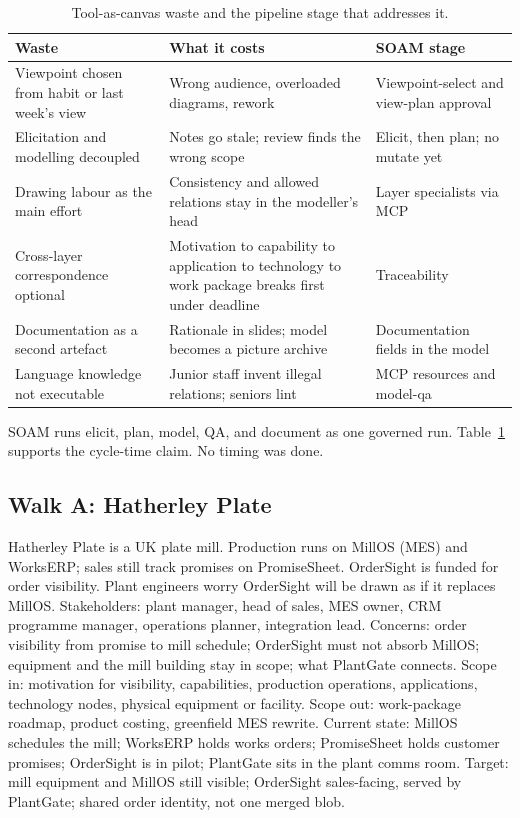 \documentclass[10pt,journal,compsoc]{IEEEtran}
\begin{document}
\begin{table}[!t]
\caption{Tool-as-canvas waste and the pipeline stage that addresses it.}
\label{tab:waste}
\centering
{\scriptsize
\begin{tabularx}{\columnwidth}{@{}>{\raggedright\arraybackslash}p{} >{\raggedright\arraybackslash}X >{\raggedright\arraybackslash}p{}@{}}
\toprule
\textbf{Waste} & \textbf{What it costs} & \textbf{SOAM stage} \\
\midrule
Viewpoint chosen from habit or last week's view & Wrong audience, overloaded diagrams, rework & Viewpoint-select and view-plan approval \\
Elicitation and modelling decoupled & Notes go stale; review finds the wrong scope & Elicit, then plan; no mutate yet \\
Drawing labour as the main effort & Consistency and allowed relations stay in the modeller's head & Layer specialists via MCP \\
Cross-layer correspondence optional & Motivation to capability to application to technology to work package breaks first under deadline & Traceability \\
Documentation as a second artefact & Rationale in slides; model becomes a picture archive & Documentation fields in the model \\
Language knowledge not executable & Junior staff invent illegal relations; seniors lint & MCP resources and model-qa \\
\bottomrule
\end{tabularx}}
\end{table}

SOAM runs elicit, plan, model, QA, and document as one governed run. Table~\ref{tab:waste} supports the cycle-time claim. No timing was done.

\subsection{Walk A: Hatherley Plate}

Hatherley Plate is a UK plate mill. Production runs on MillOS (MES) and WorksERP; sales still track promises on PromiseSheet. OrderSight is funded for order visibility. Plant engineers worry OrderSight will be drawn as if it replaces MillOS. Stakeholders: plant manager, head of sales, MES owner, CRM programme manager, operations planner, integration lead. Concerns: order visibility from promise to mill schedule; OrderSight must not absorb MillOS; equipment and the mill building stay in scope; what PlantGate connects. Scope in: motivation for visibility, capabilities, production operations, applications, technology nodes, physical equipment or facility. Scope out: work-package roadmap, product costing, greenfield MES rewrite. Current state: MillOS schedules the mill; WorksERP holds works orders; PromiseSheet holds customer promises; OrderSight is in pilot; PlantGate sits in the plant comms room. Target: mill equipment and MillOS still visible; OrderSight sales-facing, served by PlantGate; shared order identity, not one merged blob.
\end{document}
